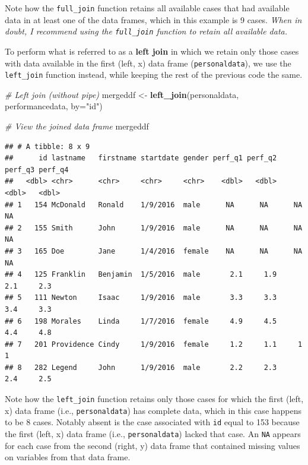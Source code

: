 \documentclass[]{book}
\newenvironment{Shaded}{\begin{snugshade}}{\end{snugshade}}
\newcommand{\KeywordTok}[1]{\textcolor[rgb]{0.13,0.29,0.53}{\textbf{#1}}}
\newcommand{\DataTypeTok}[1]{\textcolor[rgb]{0.13,0.29,0.53}{#1}}
\newcommand{\StringTok}[1]{\textcolor[rgb]{0.31,0.60,0.02}{#1}}
\newcommand{\CommentTok}[1]{\textcolor[rgb]{0.56,0.35,0.01}{\textit{#1}}}
\newcommand{\NormalTok}[1]{#1}
\begin{document}
Note how the \texttt{full\_join} function retains all available cases
that had available data in at least one of the data frames, which in
this example is 9 cases. \emph{When in doubt, I recommend using the
\texttt{full\_join} function to retain all available data.}

To perform what is referred to as a \textbf{left join} in which we
retain only those cases with data available in the first (left, x) data
frame (\texttt{personaldata}), we use the \texttt{left\_join} function
instead, while keeping the rest of the previous code the same.

\begin{Shaded}
\begin{Highlighting}[]
\CommentTok{# Left join (without pipe)}
\NormalTok{mergeddf <-}\StringTok{ }\KeywordTok{left_join}\NormalTok{(personaldata, performancedata, }\DataTypeTok{by=}\StringTok{"id"}\NormalTok{)}

\CommentTok{# View the joined data frame}
\NormalTok{mergeddf}
\end{Highlighting}
\end{Shaded}

\begin{verbatim}
## # A tibble: 8 x 9
##      id lastname   firstname startdate gender perf_q1 perf_q2 perf_q3 perf_q4
##   <dbl> <chr>      <chr>     <chr>     <chr>    <dbl>   <dbl>   <dbl>   <dbl>
## 1   154 McDonald   Ronald    1/9/2016  male      NA      NA      NA      NA  
## 2   155 Smith      John      1/9/2016  male      NA      NA      NA      NA  
## 3   165 Doe        Jane      1/4/2016  female    NA      NA      NA      NA  
## 4   125 Franklin   Benjamin  1/5/2016  male       2.1     1.9     2.1     2.3
## 5   111 Newton     Isaac     1/9/2016  male       3.3     3.3     3.4     3.3
## 6   198 Morales    Linda     1/7/2016  female     4.9     4.5     4.4     4.8
## 7   201 Providence Cindy     1/9/2016  female     1.2     1.1     1       1  
## 8   282 Legend     John      1/9/2016  male       2.2     2.3     2.4     2.5
\end{verbatim}

Note how the \texttt{left\_join} function retains only those cases for
which the first (left, x) data frame (i.e., \texttt{personaldata}) has
complete data, which in this case happens to be 8 cases. Notably absent
is the case associated with \texttt{id} equal to 153 because the first
(left, x) data frame (i.e., \texttt{personaldata}) lacked that case. An
\texttt{NA} appears for each case from the second (right, y) data frame
that contained missing values on variables from that data frame.
\end{document}
